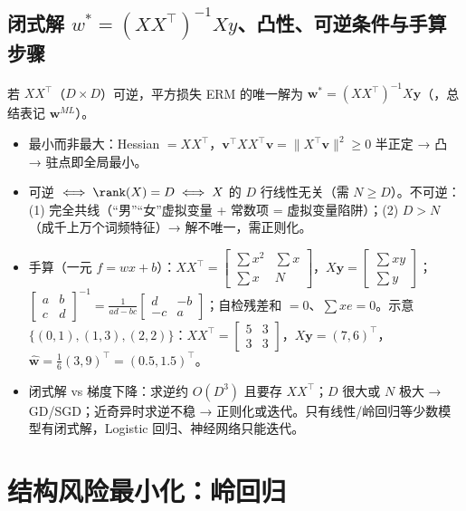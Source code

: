 \subsection{闭式解 \texorpdfstring{$w^*=(XX^\top)^{-1}Xy$}{w*=(XX')^-1 Xy}、凸性、可逆条件与手算步骤}
\begin{thm}[最小二乘解]
若 $XX^\top$（$D\times D$）可逆，平方损失 ERM 的唯一解为 $\bm w^*=(XX^\top)^{-1}X\bm y$（，总结表记 $\bm w^{ML}$）。
\end{thm}
\begin{itemize}
\item 最小而非最大：Hessian $=XX^\top$，$\bm v^\top XX^\top\bm v=\|X^\top\bm v\|^2\ge0$ 半正定 → 凸 → 驻点即全局最小。
\item 可逆 $\iff\rank(X)=D\iff X$ 的 $D$ 行线性无关（需 $N\ge D$）。不可逆：(1) 完全共线（“男”“女”虚拟变量 + 常数项 = 虚拟变量陷阱）；(2) $D>N$（成千上万个词频特征）→ 解不唯一，需正则化。
\item 手算（一元 $f=wx+b$）：$XX^\top=\left[\begin{smallmatrix}\sum x^2&\sum x\\\sum x&N\end{smallmatrix}\right]$，$X\bm y=\left[\begin{smallmatrix}\sum xy\\\sum y\end{smallmatrix}\right]$；$\left[\begin{smallmatrix}a&b\\c&d\end{smallmatrix}\right]^{-1}=\frac1{ad-bc}\left[\begin{smallmatrix}d&-b\\-c&a\end{smallmatrix}\right]$；自检残差和 $=0$、$\sum xe=0$。示意 $\{(0,1),(1,3),(2,2)\}$：$XX^\top=\left[\begin{smallmatrix}5&3\\3&3\end{smallmatrix}\right]$，$X\bm y=(7,6)^\top$，$\hat{\bm w}=\frac16(3,9)^\top=(0.5,1.5)^\top$。
\item 闭式解 vs 梯度下降：求逆约 $O(D^3)$ 且要存 $XX^\top$；$D$ 很大或 $N$ 极大 → GD/SGD；近奇异时求逆不稳 → 正则化或迭代。只有线性/岭回归等少数模型有闭式解，Logistic 回归、神经网络只能迭代。
\end{itemize}

\section{结构风险最小化：岭回归}

